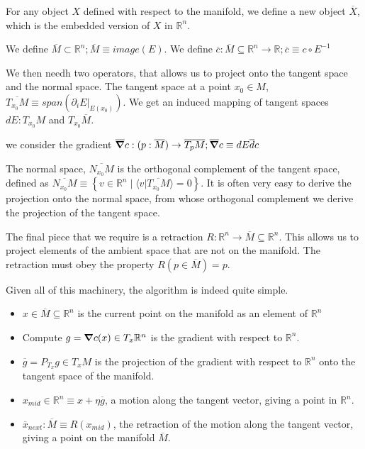 \documentclass[11pt]{book}
\begin{document}
For any object $X$
defined with respect to the manifold, we define a new object $\overline X$, which
is the embedded version of $X$ in $\mathbb R^n$.

We define $\overline M \subset \mathbb R^n; \overline M \equiv image(E)$.
We define $\overline c: \overline M \subseteq \mathbb R^n \rightarrow \mathbb R; \overline c \equiv c \circ E^{-1}$

We then needh two operators, that allows us to project onto the tangent space
and the normal space. The tangent space at a point $x_0 \in M$, $\overline{T_{x_0} M} \equiv span(\partial_i E |_{E(x_0)})$.
We get an induced mapping of tangent spaces $dE: T_{x_0} M$ and $T_{x_0} \overline M$.

we consider the gradient
$\overline \grad c : (p: \overline M) \rightarrow \overline{T_p M}; \overline \grad c \equiv dE \overline dc$

The normal space,
$\overline{N_{x_0} M}$ is the orthogonal complement of the tangent space, defined
as $\overline{N_{x_0} M} \equiv \left\{ v \in \mathbb R^n \mid \langle v | \overline{T_{x_0} M} \rangle = 0 \right\}$.
It is often very easy to derive the projection onto the normal space, from
whose orthogonal complement we derive the projection of the tangent space.

The final piece that we require is a retraction $R: \mathbb R^n \rightarrow \overline M \subseteq \mathbb R^n$. This allows
us to project elements of the ambient space that are not on the manifold. The
retraction must obey the property $R(p \in \overline M) = p$.

Given all of this machinery, the algorithm is indeed quite simple.

\begin{itemize}
	\item $x \in \overline M \subseteq \mathbb R^n$ is the current point on the manifold as an element of $\mathbb R^n$
	\item Compute $g = \grad c(x) \in T_x \mathbb R^n$ is the gradient with respect to $\mathbb R^n$.
	\item $\overline g = P_{T_x} g \in T_x M$ is the projection of the gradient with respect to $\mathbb R^n$ onto the
	tangent space of the manifold.
	\item $x_{mid}\in \mathbb R^n \equiv x + \eta \overline g$, a motion along the tangent vector, giving a point in
	$\mathbb R^n$.
	\item $\overline x_{next}: \overline M \equiv R(x_{mid})$, the retraction of the motion along the tangent vector,
	giving a point on the manifold $\overline M$.
\end{itemize}
\end{document}
